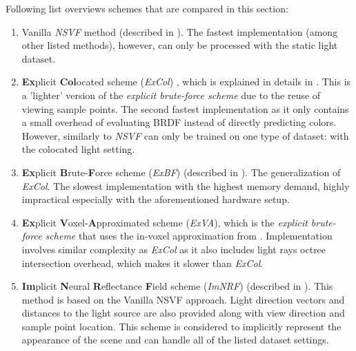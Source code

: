 Following list overviews schemes that are compared in this section:
\begin{enumerate}
    \item Vanilla \textit{NSVF} method \cite{liu2021neural} (described in ).
    The fastest implementation (among other listed methods),
    however, can only be processed with the static light dataset.
    \item \textbf{Ex}plicit \textbf{Col}ocated scheme (\textit{ExCol}) \cite{bi2020neural, liu2021neural}, which is explained in details in .
    This is a 'lighter' version of the \textit{explicit brute-force scheme}
    due to the reuse of viewing sample points.
    The second fastest implementation as it only contains
    a small overhead of evaluating BRDF instead of directly predicting colors.
    However, similarly to \textit{NSVF} can only be trained on one type of dataset: with the colocated light setting.
    \item \textbf{Ex}plicit \textbf{B}rute-\textbf{F}orce scheme (\textit{ExBF}) (described in ).
    The generalization of \textit{ExCol}.
    The slowest implementation with the highest memory demand,
    highly impractical especially with the aforementioned hardware setup.
    \item \textbf{Ex}plicit \textbf{V}oxel-\textbf{A}pproximated scheme (\textit{ExVA}), which is the \textit{explicit brute-force scheme}
    that uses the in-voxel approximation from .
    Implementation involves similar complexity as \textit{ExCol}
    as it also includes light rays octree intersection overhead,
    which makes it slower than \textit{ExCol}.
    \item \textbf{Im}plicit \textbf{N}eural \textbf{R}eflectance \textbf{F}ield scheme (\textit{ImNRF}) (described in ).
    This method is based on the Vanilla NSVF approach.
    Light direction vectors and distances to the light source are also provided along with view direction and sample point location.
    This scheme is considered to implicitly represent the appearance of the scene
    and can handle all of the listed dataset settings.
\end{enumerate}




